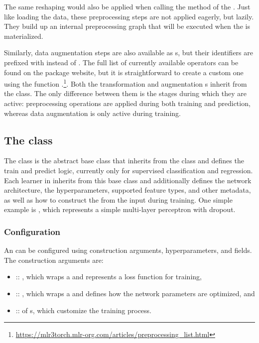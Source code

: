 \documentclass[article]{jss}
\theoremstyle{definition}
\begin{document}
The same reshaping would also be applied when calling the  method of the .
Just like loading the data, these preprocessing steps are not applied eagerly, but lazily.
They build up an internal preprocessing graph that will be executed when the  is materialized.

Similarly, data augmentation steps are also available as s, but their identifiers are prefixed with  instead of .
The full list of currently available operators can be found on the package website, but it is straightforward to create a custom one using the function .\footnote{\url{https://mlr3torch.mlr-org.com/articles/preprocessing_list.html}}.
Both the transformation and augmentation s inherit from the  class.
The only difference between them is the stages during which they are active: preprocessing operations are applied during both training and prediction, whereas data augmentation is only active during training.


\subsection[The LearnerTorch class]{The  class}

The   class is the abstract base class that inherits from the  class and defines the train and predict logic, currently only for supervised classification and regression.
Each learner in  inherits from this base class and additionally defines the network architecture, the hyperparameters, supported feature types, and other metadata, as well as how to construct the  from the input  during training.
One simple example is , which represents a simple multi-layer perceptron with dropout.

\subsubsection{Configuration}

An \mlrttorch{}  can be configured using construction arguments, hyperparameters, and fields.
The construction arguments are:

\begin{itemize}
    \item {} :: , which wraps a  and represents a loss function for training,
    \item {} :: , which wraps a  and defines how the network parameters are optimized, and
    \item {} ::  of s, which customize the training process.
\end{itemize}
\end{document}
